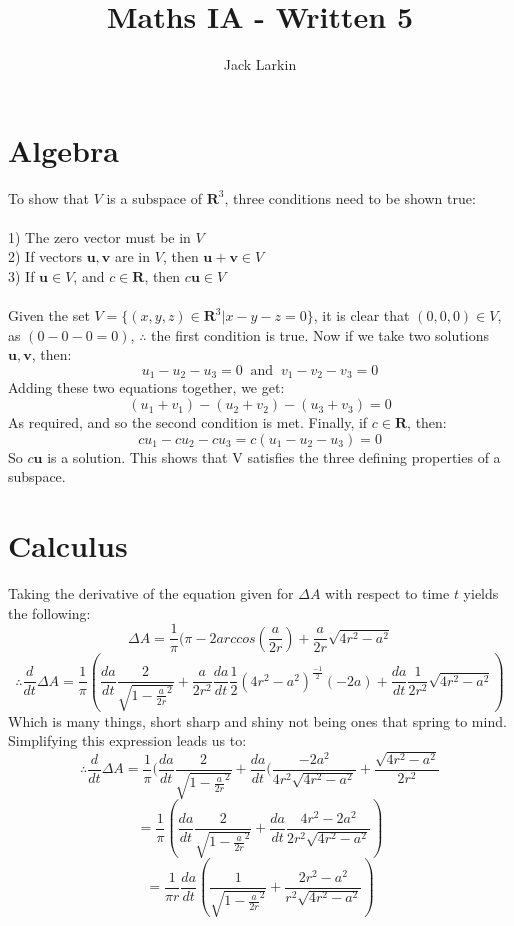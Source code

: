 \documentclass[11pt]{article}
\title{\textbf{Maths IA - Written 5}}
\date{}
\author{Jack Larkin}
\begin{document}
\maketitle

\section*{Algebra}
To show that $V$ is a subspace of $\mathbf{R}^3$, three conditions need to be shown true:\\
\\1) The zero vector must be in $V$
\\2) If vectors $\mathbf{u,v}$ are in $V$, then $\mathbf{u+v} \in V$
\\3) If $\mathbf{u}\in V$, and $c \in \mathbf{R}$, then $c\mathbf{u}\in V$\\\\
Given the set $V=\{(x,y,z)\in\mathbf{R}^3|x-y-z=0\}$, it is clear that $(0,0,0)\in V$, as $(0-0-0=0)$, $\therefore$ the first condition is true.
Now if we take two solutions $\mathbf{u,v}$, then:
$$u_1-u_2-u_3=0 \;\;\text{and}\;\;v_1-v_2-v_3=0$$
Adding these two equations together, we get:
$$(u_1+v_1)-(u_2+v_2)-(u_3+v_3)=0$$
As required, and so the second condition is met.
Finally, if $c\in\mathbf{R}$, then:
$$cu_1-cu_2-cu_3=c(u_1-u_2-u_3)=0$$
So $c\mathbf{u}$ is a solution. This shows that V satisfies the three defining properties of a subspace.
\section*{Calculus}
Taking the derivative of the equation given for $\Delta A$ with respect to time $t$ yields the following:
$$\Delta A = \frac{1}{\pi}(\pi - 2arccos(\frac{a}{2r})+ \frac{a}{2r}\sqrt{4r^2-a^2}$$
$$\therefore \frac{d}{dt}\Delta A = \frac{1}{\pi} ( \frac{da}{dt}\frac{2}{\sqrt{1-\frac{a}{2r}^2}}+\frac{a}{2r^2}\frac{da}{dt}\frac{1}{2}(4r^2-a^2)^{\frac{-1}{2}}(-2a)+\frac{da}{dt}\frac{1}{2r^2}\sqrt{4r^2-a^2}) $$
Which is many things, short sharp and shiny not being ones that spring to mind. Simplifying this expression leads us to:
$$\therefore \frac{d}{dt}\Delta A = \frac{1}{\pi} ( \frac{da}{dt}\frac{2}{\sqrt{1-\frac{a}{2r}^2}}+\frac{da}{dt}(\frac{-2a^2}{4r^2\sqrt{4r^2-a^2}}+\frac{\sqrt{4r^2-a^2}}{2r^2} $$
$$ = \frac{1}{\pi} ( \frac{da}{dt}\frac{2}{\sqrt{1-\frac{a}{2r}^2}}+\frac{da}{dt}\frac{4r^2-2a^2}{2r^2\sqrt{4r^2-a^2}})$$
$$ = \frac{1}{\pi r}\frac{da}{dt}(\frac{1}{\sqrt{1-\frac{a}{2r}^2}}+\frac{2r^2-a^2}{r^2\sqrt{4r^2-a^2}})$$
\end{document}
